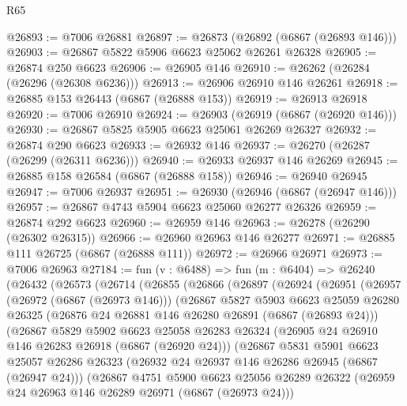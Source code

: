 \begin{lexlean}{R65}
\begin{coremodule}
{@26893 := @7006 @26881
@26897 := @26873 (@26892 (@6867 (@26893 @146)))
@26903 := @26867 @5822 @5906 @6623 @25062 @26261 @26328
@26905 := @26874 @250 @6623
@26906 := @26905 @146
@26910 := @26262 (@26284 (@26296 (@26308 @6236)))
@26913 := @26906 @26910 @146 @26261
@26918 := @26885 @153 @26443 (@6867 (@26888 @153))
@26919 := @26913 @26918
@26920 := @7006 @26910
@26924 := @26903 (@26919 (@6867 (@26920 @146)))
@26930 := @26867 @5825 @5905 @6623 @25061 @26269 @26327
@26932 := @26874 @290 @6623
@26933 := @26932 @146
@26937 := @26270 (@26287 (@26299 (@26311 @6236)))
@26940 := @26933 @26937 @146 @26269
@26945 := @26885 @158 @26584 (@6867 (@26888 @158))
@26946 := @26940 @26945
@26947 := @7006 @26937
@26951 := @26930 (@26946 (@6867 (@26947 @146)))
@26957 := @26867 @4743 @5904 @6623 @25060 @26277 @26326
@26959 := @26874 @292 @6623
@26960 := @26959 @146
@26963 := @26278 (@26290 (@26302 @26315))
@26966 := @26960 @26963 @146 @26277
@26971 := @26885 @111 @26725 (@6867 (@26888 @111))
@26972 := @26966 @26971
@26973 := @7006 @26963
@27184 := fun (v : @6488) =>
  fun (m : @6404) =>
  @26240
    (@26432
      (@26573
        (@26714
          (@26855
            (@26866
              (@26897
                (@26924
                  (@26951
                    (@26957
                      (@26972 (@6867 (@26973 @146)))
                      (@26867
                        @5827
                        @5903
                        @6623
                        @25059
                        @26280
                        @26325
                        (@26876 @24 @26881 @146 @26280 @26891 (@6867 (@26893 @24)))
                        (@26867
                          @5829
                          @5902
                          @6623
                          @25058
                          @26283
                          @26324
                          (@26905 @24 @26910 @146 @26283 @26918 (@6867 (@26920 @24)))
                          (@26867
                            @5831
                            @5901
                            @6623
                            @25057
                            @26286
                            @26323
                            (@26932 @24 @26937 @146 @26286 @26945 (@6867 (@26947 @24)))
                            (@26867
                              @4751
                              @5900
                              @6623
                              @25056
                              @26289
                              @26322
                              (@26959 @24 @26963 @146 @26289 @26971 (@6867 (@26973 @24)))
}
\end{coremodule}
\end{lexlean}
